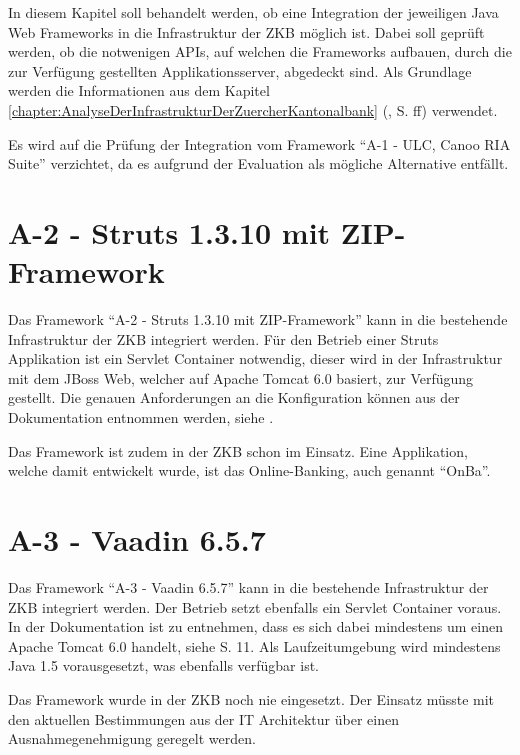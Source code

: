 In diesem Kapitel soll behandelt werden, ob eine Integration der jeweiligen Java
Web Frameworks in die Infrastruktur der \ac{ZKB} möglich ist. Dabei soll geprüft
werden, ob die notwenigen \acp{API}, auf welchen die Frameworks aufbauen, durch
die zur Verfügung gestellten Applikationsserver, abgedeckt sind. Als Grundlage
werden die Informationen aus dem Kapitel
\ref{chapter:AnalyseDerInfrastrukturDerZuercherKantonalbank}
(, S.
\pageref{chapter:AnalyseDerInfrastrukturDerZuercherKantonalbank}ff) verwendet.

Es wird auf die Prüfung der Integration vom Framework ``A-1 - ULC, Canoo RIA
Suite'' verzichtet, da es aufgrund der Evaluation als mögliche Alternative
entfällt.

\section{A-2 - Struts 1.3.10 mit ZIP-Framework}

Das Framework ``A-2 - Struts 1.3.10 mit ZIP-Framework'' kann in die bestehende
Infrastruktur der \ac{ZKB} integriert werden. Für den Betrieb einer Struts
Applikation ist ein Servlet Container notwendig, dieser wird in der
Infrastruktur mit dem JBoss Web, welcher auf Apache Tomcat 6.0 basiert, zur
Verfügung gestellt. Die genauen Anforderungen an die Konfiguration können aus
der Dokumentation entnommen werden, siehe \cite{StrutsDokumentation}.

Das Framework ist zudem in der \ac{ZKB} schon im Einsatz. Eine Applikation,
welche damit entwickelt wurde, ist das Online-Banking, auch genannt ``OnBa''.

\section{A-3 - Vaadin 6.5.7}

Das Framework ``A-3 - Vaadin 6.5.7'' kann in die bestehende
Infrastruktur der \ac{ZKB} integriert werden. Der Betrieb setzt ebenfalls ein
Servlet Container voraus. In der Dokumentation ist zu entnehmen, dass es sich
dabei mindestens um einen Apache Tomcat 6.0 handelt, siehe \cite{BookOfVaadin}
S. 11. Als Laufzeitumgebung wird mindestens Java 1.5 vorausgesetzt, was
ebenfalls verfügbar ist.

Das Framework wurde in der \ac{ZKB} noch nie eingesetzt. Der Einsatz müsste mit
den aktuellen Bestimmungen aus der IT Architektur über einen Ausnahmegenehmigung
geregelt werden.

